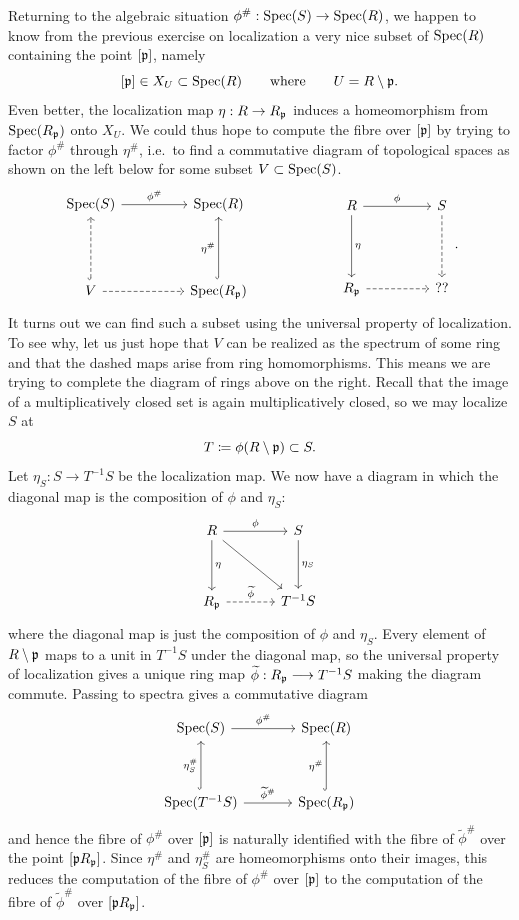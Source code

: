 \documentclass[12pt,reqno]{amsart}
\begin{document}
Returning to the algebraic situation $\phi^{\#}:\operatorname{Spec}(S) \to \operatorname{Spec}(R)$, we happen to know from the previous exercise on localization a very nice subset of $\operatorname{Spec}(R)$ containing the point $[\mathfrak{p}]$, namely
\[
[\mathfrak{p}]\in X_U\subset \operatorname{Spec}(R)
\qquad\text{where}\qquad
U=R\setminus \mathfrak{p}.
\]
Even better, the localization map $\eta:R\to R_{\mathfrak{p}}$ induces a homeomorphism from $\operatorname{Spec}(R_{\mathfrak{p}})$ onto $X_U$. We could thus hope to compute the fibre over $[\mathfrak{p}]$ by trying to factor $\phi^{\#}$ through $\eta^{\#}$, i.e.\ to find a commutative diagram of topological spaces as shown on the left below for some subset $V\subset \operatorname{Spec}(S)$.
\[
\begin{tikzcd}[row sep = 4.5em, column sep =4.5em]
	\Spec(S) \arrow[r, "\phi^{\#}"] & \Spec(R) \\
	V \arrow[u, dashed, hookrightarrow] \arrow[r, dashed] & \Spec(R_{\fp}) \arrow[u, hookrightarrow, "\eta^{\#}"]
\end{tikzcd}
\qquad\qquad\qquad
\begin{tikzcd}[row sep = 4.5em, column sep =4.5em]
	R \arrow[r, "\phi"] \arrow[d, "\eta"] & S \arrow[d, dashed] \\
	R_{\fp} \arrow[r, dashed] & ??
\end{tikzcd}.
\]
It turns out we can find such a subset using the universal property of localization. To see why, let us just hope that $V$ can be realized as the spectrum of some ring and that the dashed maps arise from ring homomorphisms. This means we are trying to complete the diagram of rings above on the right. Recall that the image of a multiplicatively closed set is again multiplicatively closed, so we may localize $S$ at
\[
T\coloneqq \phi(R\setminus\mathfrak{p})\subset S.
\]
Let $\eta_S:S\to T^{-1}S$ be the localization map. We now have a diagram in which the diagonal map is the composition of $\phi$ and $\eta_S$:
\[
\begin{tikzcd}[row sep = 3.5em, column sep =3.5em]
	R \arrow[r, "\phi"] \arrow[d, "\eta"] \arrow[dr] & S \arrow[d, "\eta_S"] \\
	R_{\fp} \arrow[r, dashed, "\widetilde{\phi}"] & T^{-1}S
\end{tikzcd}
\]
where the diagonal map is just the composition of $\phi$ and $\eta_S$. Every element of $R\setminus \mathfrak{p}$ maps to a unit in $T^{-1}S$ under the diagonal map, so the universal property of localization gives a unique ring map $\widetilde{\phi}:R_{\mathfrak{p}}\longrightarrow T^{-1}S$ making the diagram commute. Passing to spectra gives a commutative diagram
\[
\begin{tikzcd}[row sep = 3.5em, column sep =3.5em]
	\Spec(S) \arrow[r, "\phi^{\#}"] & \Spec(R) \\
	\Spec(T^{-1}S) \arrow[u, hookrightarrow, "\eta_S^{\#}"] \arrow[r, "\widetilde{\phi}^{\#}"] & \Spec(R_{\fp}) \arrow[u, hookrightarrow, "\eta^{\#}"]
\end{tikzcd}
\]
and hence the fibre of $\phi^{\#}$ over $[\mathfrak{p}]$ is naturally identified with the fibre of $\widetilde{\phi}^{\#}$ over the point $[\mathfrak{p} R_{\mathfrak{p}}]$. Since $\eta^{\#}$ and $\eta_S^{\#}$ are homeomorphisms onto their images, this reduces the computation of the fibre of $\phi^{\#}$ over $[\mathfrak{p}]$ to the computation of the fibre of $\widetilde{\phi}^{\#}$ over $[\mathfrak{p} R_{\mathfrak{p}}]$.
\end{document}
